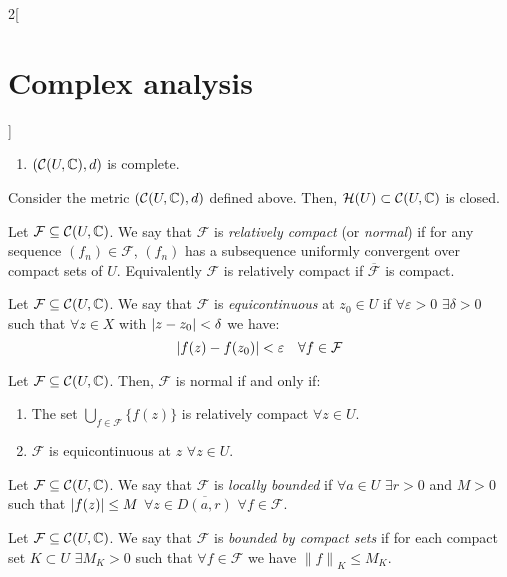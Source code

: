 \documentclass[../../../main.tex]{subfiles}
\begin{document}
\begin{multicols}{2}[\section{Complex analysis}]
\begin{theorem}
\begin{enumerate}
      \item $(\mathcal{C}(U,\mathbb{C}),d)$ is complete.
    \end{enumerate}
  \end{theorem}
  \begin{proposition}
    Consider the metric $(\mathcal{C}(U,\mathbb{C}),d)$ defined above. Then, $\mathcal{H}(U)\subset\mathcal{C}(U,\mathbb{C})$ is closed.
  \end{proposition}
  \begin{definition}
    Let $\mathcal{F}\subseteq \mathcal{C}(U,\mathbb{C})$. We say that $\mathcal{F}$ is \emph{relatively compact} (or \emph{normal}) if for any sequence $(f_n)\in\mathcal{F}$, $(f_n)$ has a subsequence uniformly convergent over compact sets of $U$. Equivalently $\mathcal{F}$ is relatively compact if $\overline{\mathcal{F}}$ is compact.
  \end{definition}
  \begin{definition}
    Let $\mathcal{F}\subseteq \mathcal{C}(U,\mathbb{C})$. We say that $\mathcal{F}$ is \emph{equicontinuous} at $z_0\in U$ if $\forall \varepsilon>0$ $\exists \delta>0$ such that $\forall z\in X$ with $\abs{z-z_0}<\delta$ we have: $$\abs{f(z)-f(z_0)}<\varepsilon\quad\forall f\in \mathcal{F}$$
  \end{definition}
  \begin{theorem}
    Let $\mathcal{F}\subseteq \mathcal{C}(U,\mathbb{C})$. Then, $\mathcal{F}$ is normal if and only if:
    \begin{enumerate}
      \item The set $\bigcup_{f\in\mathcal{F}}\{f(z)\}$ is relatively compact $\forall z\in U$.
      \item $\mathcal{F}$ is equicontinuous at $z$ $\forall z\in U$.
    \end{enumerate}
  \end{theorem}
  \begin{definition}
    Let $\mathcal{F}\subseteq \mathcal{C}(U,\mathbb{C})$. We say that $\mathcal{F}$ is \emph{locally bounded} if $\forall a\in U$ $\exists r>0$ and $M>0$ such that $\abs{f(z)}\leq M$ $\forall z\in \overline{D(a,r)}$ $\forall f\in\mathcal{F}$.
  \end{definition}
  \begin{definition}
    Let $\mathcal{F}\subseteq \mathcal{C}(U,\mathbb{C})$. We say that $\mathcal{F}$ is \emph{bounded by compact sets} if for each compact set $K\subset U$ $\exists M_K>0$ such that $\forall f\in\mathcal{F}$ we have ${\|f\|}_{K}\leq M_K$.
  \end{definition}

\end{multicols}
\end{document}
